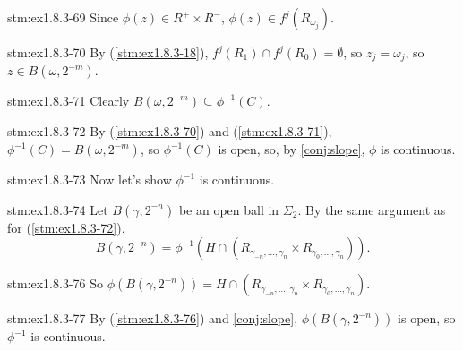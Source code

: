 \begin{statement}{stm:ex1.8.3-69}
Since $\phi(z) \in R^+ \times R^-$, $\phi(z) \in f^j(R_{\omega_j})$. 
\end{statement}

\begin{statement}{stm:ex1.8.3-70}
By (\ref{stm:ex1.8.3-18}), $f^j(R_1) \cap f^j(R_0) = \emptyset$, so $z_j = \omega_j$, so $z \in B(\omega, 2^{-m})$.
\end{statement}

\begin{statement}{stm:ex1.8.3-71}
Clearly $B(\omega, 2^{-m}) \subseteq \phi^{-1}(C)$.
\end{statement}

\begin{statement}{stm:ex1.8.3-72}
By (\ref{stm:ex1.8.3-70}) and (\ref{stm:ex1.8.3-71}), $\phi^{-1}(C) = B(\omega, 2^{-m})$, so $\phi^{-1}(C)$ is open, so, by \ref{conj:slope}, $\phi$ is continuous.
\end{statement}

\begin{explanation}{stm:ex1.8.3-73}
Now let’s show $\phi^{-1}$ is continuous.
\end{explanation}

\begin{statement}{stm:ex1.8.3-74}
Let $B(\gamma, 2^{-n})$ be an open ball in $\Sigma_2$. By the same argument as for (\ref{stm:ex1.8.3-72}),
\[
B(\gamma, 2^{-n}) = \phi^{-1}(H \cap (R_{\gamma_{-n}, \ldots, \gamma_n} \times R_{\gamma_0, \ldots, \gamma_n})).
\]
\end{statement}

\begin{statement}{stm:ex1.8.3-76}
So $\phi(B(\gamma, 2^{-n})) = H \cap (R_{\gamma_{-n}, \ldots, \gamma_n} \times R_{\gamma_0, \ldots, \gamma_n})$.
\end{statement}

\begin{statement}{stm:ex1.8.3-77}
By (\ref{stm:ex1.8.3-76}) and \ref{conj:slope}, $\phi(B(\gamma, 2^{-n}))$ is open, so $\phi^{-1}$ is continuous.
\end{statement}
